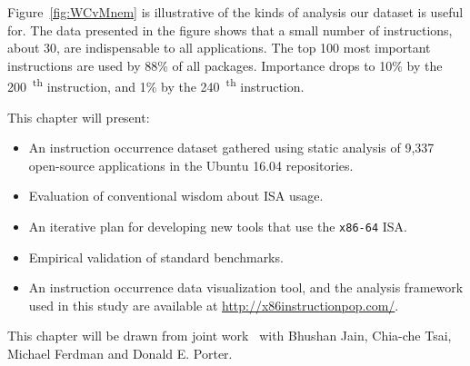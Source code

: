 Figure~\ref{fig:WCvMnem} is illustrative of the kinds of analysis our dataset
is useful for. The data presented in the figure shows that a small number of
instructions, about 30, are indispensable to all applications. The top 100
most important instructions are used by \texttildelow{}88\% of all packages.
Importance drops to 10\% by the 200~\textsuperscript{th} instruction, and 1\%
by the 240~\textsuperscript{th} instruction.

\noindent This chapter will present:
\begin{itemize}[noitemsep, topsep=0pt, leftmargin=1em, labelwidth=*, align=left]
\item An instruction occurrence dataset gathered using static analysis of
	9,337 open-source applications in the Ubuntu 16.04 repositories.
\item Evaluation of conventional wisdom about ISA usage.
\item An iterative plan for developing new tools that use the
	\texttt{x86-64} ISA.
\item Empirical validation of standard benchmarks.
\item An instruction occurrence data visualization tool, and the analysis framework used in this study are available at
	\url{http://x86instructionpop.com/}.
\end{itemize}

This chapter will be drawn from joint work~\cite{x86-systor} with Bhushan
Jain, Chia-che Tsai, Michael Ferdman and Donald E. Porter.